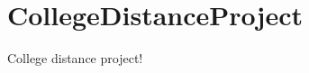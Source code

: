 \chapter{College\+Distance\+Project}
\hypertarget{index}{}\label{index}
\label{index_md__r_e_a_d_m_e}%
%
College distance project! 